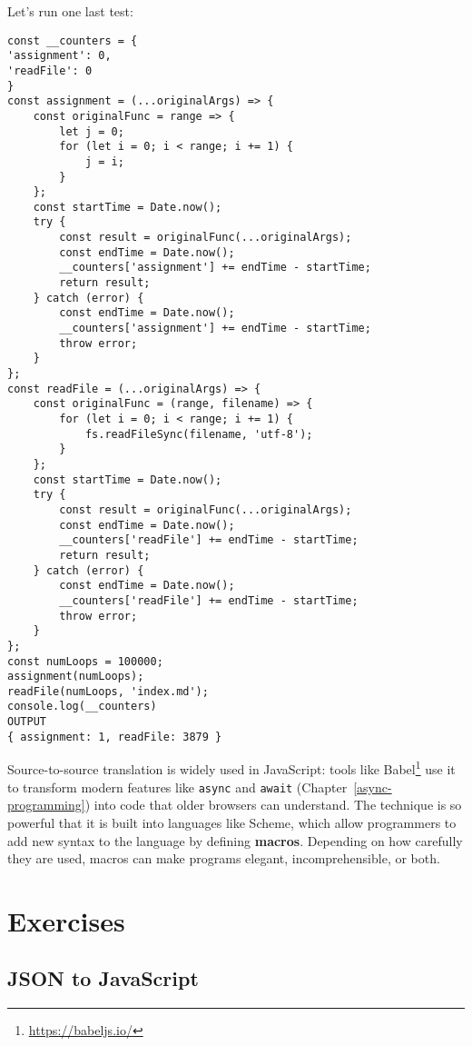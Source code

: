 \documentclass[krantzl]{krantz}
\newcommand{\chapref}[1]{Chapter~\ref{#1}}
\newcommand{\glossref}[1]{\textbf{#1}}
\newcommand{\hreffoot}[2]{{#1}\footnote{\href{#2}{#2}}}
\begin{document}
Let's run one last test:


\begin{lstlisting}[frame=single,frameround=tttt]
const __counters = {
'assignment': 0,
'readFile': 0
}
const assignment = (...originalArgs) => {
    const originalFunc = range => {
        let j = 0;
        for (let i = 0; i < range; i += 1) {
            j = i;
        }
    };
    const startTime = Date.now();
    try {
        const result = originalFunc(...originalArgs);
        const endTime = Date.now();
        __counters['assignment'] += endTime - startTime;
        return result;
    } catch (error) {
        const endTime = Date.now();
        __counters['assignment'] += endTime - startTime;
        throw error;
    }
};
const readFile = (...originalArgs) => {
    const originalFunc = (range, filename) => {
        for (let i = 0; i < range; i += 1) {
            fs.readFileSync(filename, 'utf-8');
        }
    };
    const startTime = Date.now();
    try {
        const result = originalFunc(...originalArgs);
        const endTime = Date.now();
        __counters['readFile'] += endTime - startTime;
        return result;
    } catch (error) {
        const endTime = Date.now();
        __counters['readFile'] += endTime - startTime;
        throw error;
    }
};
const numLoops = 100000;
assignment(numLoops);
readFile(numLoops, 'index.md');
console.log(__counters)
OUTPUT
{ assignment: 1, readFile: 3879 }
\end{lstlisting}



Source-to-source translation is widely used in JavaScript:
tools like \hreffoot{Babel}{https://babeljs.io/} use it to transform modern features like \texttt{async} and \texttt{await}
(\chapref{async-programming})
into code that older browsers can understand.
The technique is so powerful that it is built into languages like Scheme,
which allow programmers to add new syntax to the language
by defining \glossref{macros}.
Depending on how carefully they are used,
macros can make programs elegant, incomprehensible, or both.


\section{Exercises}\label{code-generator-exercises}

\subsection*{JSON to JavaScript}
\end{document}
